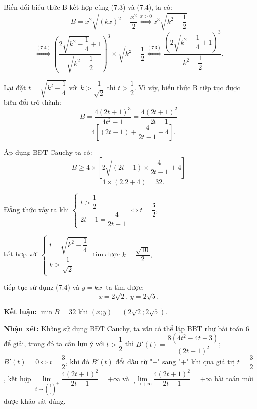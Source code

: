 \documentclass[12pt]{report}
\begin{document}
\vspace{0.2cm}
\noindent Biến đổi biểu thức B kết hợp cùng (7.3) và (7.4), ta có:
\[
B = x^2\sqrt{(kx)^2 - \dfrac{x^2}{2}} \overset{x > 0}{\Leftrightarrow} x^3\sqrt{k^2 - \dfrac{1}{2}}
\]
\[
\overset{(7.4)}{\Leftrightarrow} \left( \dfrac{2\sqrt{k^2 - \dfrac{1}{4}} + 1}{\sqrt{k^2 - \dfrac{1}{2}}} \right)^3 \times \sqrt{k^2 - \dfrac{1}{2}} \overset{(7.3)}{\Leftrightarrow} \dfrac{\left(2\sqrt{k^2 - \dfrac{1}{4}} + 1\right)^3}{k^2 - \dfrac{1}{2}}.
\]

\vspace{0.2cm}
\noindent Lại đặt $t = \sqrt{k^2 - \dfrac{1}{4}}$ với $k > \dfrac{1}{\sqrt{2}}$ thì $t > \dfrac{1}{2}$. Vì vậy, biểu thức B tiếp tục được biến đổi trở thành:
\[
B = \dfrac{4(2t + 1)^3}{4t^2 - 1} = \dfrac{4(2t + 1)^2}{2t - 1}
\]
\[
= 4 \left[ (2t - 1) + \dfrac{4}{2t - 1} + 4 \right].
\]

\vspace{0.2cm}
\noindent Áp dụng BĐT Cauchy ta có:
\[
B \geq 4 \times \left[ 2\sqrt{(2t - 1) \times \dfrac{4}{2t - 1}} + 4 \right]
\]
\[
= 4 \times (2.2 + 4) = 32.
\]

\noindent Đẳng thức xảy ra khi $\begin{cases} t > \dfrac{1}{2} \\[10pt] 2t - 1 = \dfrac{4}{2t - 1} \end{cases} \Leftrightarrow t = \dfrac{3}{2}$,

\vspace{0.2cm}
\noindent kết hợp với $\begin{cases} t = \sqrt{k^2 - \dfrac{1}{4}} \\[10pt] k > \dfrac{1}{\sqrt{2}} \end{cases}$ tìm được $k = \dfrac{\sqrt{10}}{2}$,

\vspace{0.2cm}
\noindent tiếp tục sử dụng (7.4) và $y = kx$, ta tìm được:
\[
x = 2\sqrt{2}, \, y = 2\sqrt{5}.
\]

\noindent \textbf{Kết luận:} $\min B = 32$ khi $(x; y) = (2\sqrt{2}; 2\sqrt{5})$.

\vspace{0.2cm}
\noindent \textbf{Nhận xét:} Không sử dụng BĐT Cauchy, ta vẫn có thể lập BBT như bài toán 6 để giải, trong đó ta cần lưu ý với $t > \dfrac{1}{2}$ thì $B'(t) = \dfrac{8(4t^2 - 4t - 3)}{(2t - 1)^2}$; $B'(t) = 0 \Leftrightarrow t = \dfrac{3}{2}$, khi đó $B'(t)$ đổi dấu từ "$-$" sang "$+$" khi qua giá trị $t = \dfrac{3}{2}$, kết hợp $\lim\limits_{t \to \left(\dfrac{1}{2}\right)^+} \dfrac{4(2t + 1)^2}{2t - 1} = +\infty$ và $\lim\limits_{t \to +\infty} \dfrac{4(2t + 1)^2}{2t - 1} = +\infty$ bài toán mới được khảo sát đúng.
\end{document}
